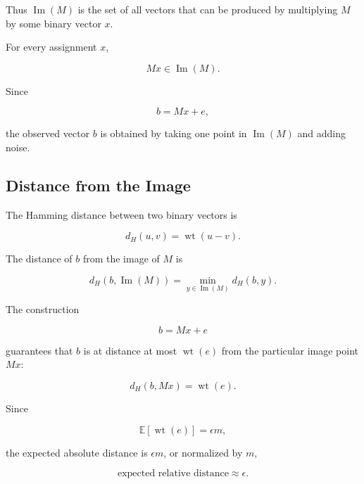 \documentclass[11pt,a4paper]{article}
\newcommand{\wt}{\operatorname{wt}}
\newcommand{\Image}{\operatorname{Im}}
\newcommand{\E}{\mathbb{E}}
\begin{document}
Thus $\Image(M)$ is the set of all vectors that can be produced by
multiplying $M$ by some binary vector $x$.

For every assignment $x$,

\begin{equation}
    Mx\in\Image(M).
\end{equation}

Since

\begin{equation}
    b=Mx+e,
\end{equation}

the observed vector $b$ is obtained by taking one point in
$\Image(M)$ and adding noise.

\subsection{Distance from the Image}

The Hamming distance between two binary vectors is

\begin{equation}
    d_H(u,v)
    =
    \wt(u-v).
\end{equation}

The distance of $b$ from the image of $M$ is

\begin{equation}
    d_H(b,\Image(M))
    =
    \min_{y\in\Image(M)}d_H(b,y).
\end{equation}

The construction

\[
b=Mx+e
\]

guarantees that $b$ is at distance at most $\wt(e)$ from the
particular image point $Mx$:

\begin{equation}
    d_H(b,Mx)=\wt(e).
\end{equation}

Since

\[
\E[\wt(e)]=\epsilon m,
\]

the expected absolute distance is $\epsilon m$, or normalized by $m$,

\begin{equation}
    \boxed{
    \text{expected relative distance}\approx\epsilon.
    }
\end{equation}

\end{document}
